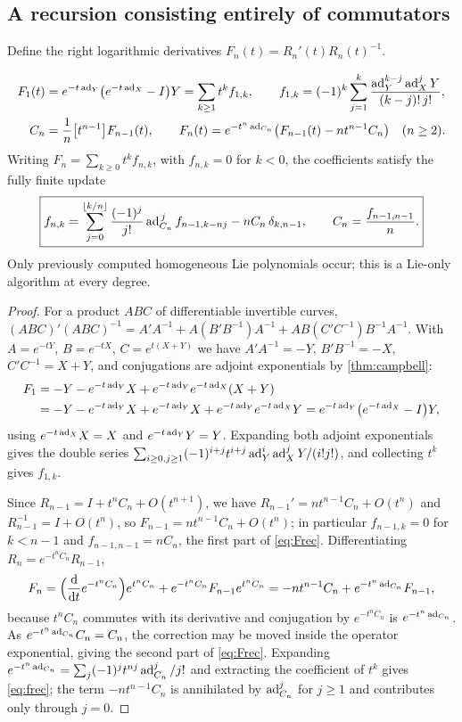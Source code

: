 \subsection{A recursion consisting entirely of commutators}
Define the right logarithmic derivatives $F_n(t)=R_n'(t)R_n(t)^{-1}$.
\begin{proposition}\label{prop:zassdiff}
\begin{align}
 F_1(t)&=e^{-t\operatorname{ad}_Y}\bigl(e^{-t\operatorname{ad}_X}-I\bigr)Y
 =\sum_{k\geq1}t^kf_{1,k},\qquad
 f_{1,k}=(-1)^k\sum_{j=1}^{k}\frac{\operatorname{ad}_Y^{k-j}\operatorname{ad}_X^{j}Y}{(k-j)!\,j!},
 \label{eq:F1}\\
 C_n&=\frac1n\bigl[t^{n-1}\bigr]F_{n-1}(t),\qquad
 F_n(t)=e^{-t^n\operatorname{ad}_{C_n}}\bigl(F_{n-1}(t)-nt^{n-1}C_n\bigr)\quad(n\geq2).
 \label{eq:Frec}
\end{align}
Writing $F_n=\sum_{k\geq0}t^kf_{n,k}$, with $f_{n,k}=0$ for $k<0$, the
coefficients satisfy the fully finite update
\begin{equation}\label{eq:frec}
 \boxed{\displaystyle
 f_{n,k}=\sum_{j=0}^{\lfloor k/n\rfloor}\frac{(-1)^j}{j!}
 \operatorname{ad}_{C_n}^{\,j}f_{n-1,k-nj}-nC_n\,\delta_{k,n-1},\qquad
 C_n=\frac{f_{n-1,n-1}}{n}.}
\end{equation}
Only previously computed homogeneous Lie polynomials occur; this is a
Lie-only algorithm at every degree.
\end{proposition}
\begin{proof}
For a product $ABC$ of differentiable invertible curves,
$(ABC)'(ABC)^{-1}=A'A^{-1}+A(B'B^{-1})A^{-1}+AB(C'C^{-1})B^{-1}A^{-1}$.
With $A=e^{-tY}$, $B=e^{-tX}$, $C=e^{t(X+Y)}$ we have $A'A^{-1}=-Y$,
$B'B^{-1}=-X$, $C'C^{-1}=X+Y$, and conjugations are adjoint exponentials
by \cref{thm:campbell}:
\begin{align*}
 F_1&=-Y-e^{-t\operatorname{ad}_Y}X+e^{-t\operatorname{ad}_Y}e^{-t\operatorname{ad}_X}(X+Y)\\
 &=-Y-e^{-t\operatorname{ad}_Y}X+e^{-t\operatorname{ad}_Y}X+e^{-t\operatorname{ad}_Y}e^{-t\operatorname{ad}_X}Y
 =e^{-t\operatorname{ad}_Y}\bigl(e^{-t\operatorname{ad}_X}-I\bigr)Y,
\end{align*}
using $e^{-t\operatorname{ad}_X}X=X$ and $e^{-t\operatorname{ad}_Y}Y=Y$. Expanding both adjoint
exponentials gives the double series
$\sum_{i\geq0,j\geq1}(-1)^{i+j}t^{i+j}\operatorname{ad}_Y^i\operatorname{ad}_X^jY/(i!j!)$, and
collecting $t^k$ gives $f_{1,k}$.

Since $R_{n-1}=I+t^nC_n+O(t^{n+1})$, we have
$R_{n-1}'=nt^{n-1}C_n+O(t^n)$ and $R_{n-1}^{-1}=I+O(t^n)$, so
$F_{n-1}=nt^{n-1}C_n+O(t^n)$; in particular $f_{n-1,k}=0$ for $k<n-1$
and $f_{n-1,n-1}=nC_n$, the first part of \eqref{eq:Frec}. Differentiating
$R_n=e^{-t^nC_n}R_{n-1}$,
\[
 F_n=\Bigl(\frac{\mathrm{d}}{\mathrm{d} t}e^{-t^nC_n}\Bigr)e^{t^nC_n}
 +e^{-t^nC_n}F_{n-1}e^{t^nC_n}
 =-nt^{n-1}C_n+e^{-t^n\operatorname{ad}_{C_n}}F_{n-1},
\]
because $t^nC_n$ commutes with its derivative and conjugation by
$e^{-t^nC_n}$ is $e^{-t^n\operatorname{ad}_{C_n}}$. As $e^{-t^n\operatorname{ad}_{C_n}}C_n=C_n$, the
correction may be moved inside the operator exponential, giving the second
part of \eqref{eq:Frec}. Expanding
$e^{-t^n\operatorname{ad}_{C_n}}=\sum_j(-1)^jt^{nj}\operatorname{ad}_{C_n}^j/j!$ and extracting the
coefficient of $t^k$ gives \eqref{eq:frec}; the term $-nt^{n-1}C_n$ is
annihilated by $\operatorname{ad}_{C_n}^j$ for $j\geq1$ and contributes only through
$j=0$.
\end{proof}

